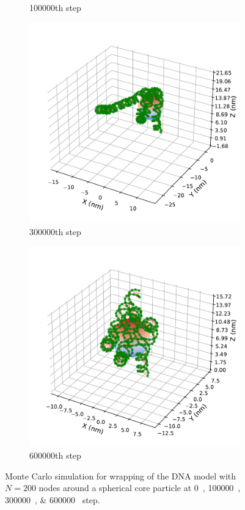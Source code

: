 \documentclass[a4paper,10pt]{article}
\begin{document}
\begin{figure}[htbp]
\begin{subfigure}{.49\textwidth}
\caption{100000th step}
\label{fig:hist_b}
\end{subfigure}
\begin{subfigure}{.49\textwidth}
\includegraphics[width=\textwidth]{hist_300000.pdf}
\caption{300000th step}
\label{fig:hist_c}
\end{subfigure}
\begin{subfigure}{.49\textwidth}
\includegraphics[width=\textwidth]{hist_600000.pdf}
\caption{600000th step}
\label{fig:hist_d}
\end{subfigure}
\caption{Monte Carlo simulation for wrapping of the DNA model with $N=200$ nodes around a spherical core particle at \SIlist{0;100000;300000;600000}{} step.}
\label{fig:hist}
\end{figure}
\end{document}
